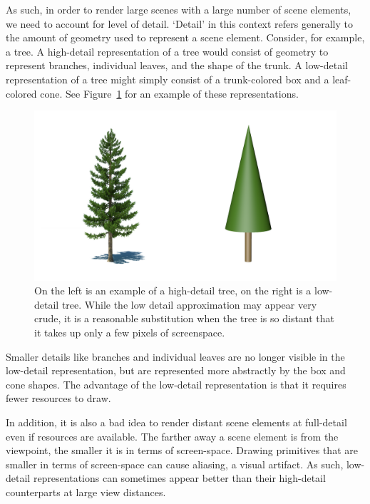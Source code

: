 As such, in order to render large scenes with a large number of scene elements, we need to account for level of detail.
`Detail' in this context refers generally to the amount of geometry used to represent a scene element.
Consider, for example, a tree.{}
A high-detail representation of a tree would consist of geometry to represent branches, individual leaves, and the shape of the trunk.
A low-detail representation of a tree might simply consist of a trunk-colored box and a leaf-colored cone.
See Figure~\ref{fig:trees} for an example of these representations.

\begin{figure}
	\centering
		\includegraphics[width=1.0\textwidth]{figures/TreeComparison.png}
	\caption{On the left is an example of a high-detail tree, on the right is a low-detail tree.
	While the low detail approximation may appear very crude, it is a reasonable substitution when the tree is so distant that it takes up only a few pixels of screenspace.}
	\label{fig:trees}
\end{figure}


Smaller details like branches and individual leaves are no longer visible in the low-detail representation, but are represented more abstractly by the box and cone shapes.
The advantage of the low-detail representation is that it requires fewer resources to draw.

In addition, it is also a bad idea to render distant scene elements at full-detail even if resources are available.
The farther away a scene element is from the viewpoint, the smaller it is in terms of screen-space.
Drawing primitives that are smaller in terms of screen-space can cause aliasing, a visual artifact.
As such, low-detail representations can sometimes appear better than their high-detail counterparts at large view distances.

